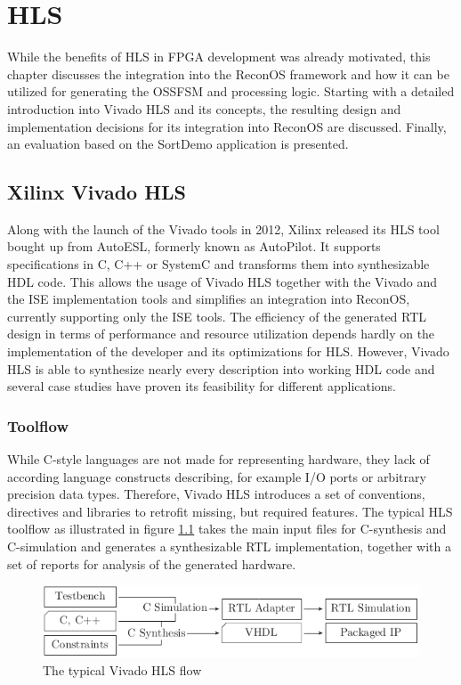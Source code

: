\chapter{\acl{HLS}}
\label{chap:hls}
While the benefits of \ac{HLS} in \ac{FPGA} development was already motivated,
this chapter discusses the integration into the ReconOS framework and how it
can be utilized for generating the \ac{OSSFSM} and processing logic. Starting
with a detailed introduction into Vivado HLS and its concepts, the resulting
design and implementation decisions for its integration into ReconOS are
discussed. Finally, an evaluation based on the SortDemo application is
presented.

\section{Xilinx Vivado HLS}
Along with the launch of the Vivado tools in 2012, Xilinx released its
\ac{HLS} tool bought up from AutoESL, formerly known as AutoPilot. It supports
specifications in C, C++ or SystemC and transforms them into synthesizable
\ac{HDL} code. This allows the usage of Vivado \ac{HLS} together with the
Vivado and the ISE implementation tools and simplifies an integration into
ReconOS, currently supporting only the ISE tools. The efficiency of the
generated RTL design in terms of performance and resource utilization depends
hardly on the implementation of the developer and its optimizations for
\ac{HLS}. However, Vivado HLS is able to synthesize nearly every description
into working \ac{HDL} code and several case studies \citep{SWL13,OCC14} have
proven its feasibility for different applications.

\subsection{Toolflow}
While C-style languages are not made for representing hardware, they lack of
according language constructs describing, for example I/O ports or arbitrary
precision data types. Therefore, Vivado HLS introduces a set of conventions,
directives and libraries to retrofit missing, but required features. The
typical \ac{HLS} toolflow as illustrated in figure \ref{fig:hls_flow} takes
the main input files for C-synthesis and C-simulation and generates a
synthesizable \ac{RTL} implementation, together with a set of reports for
analysis of the generated hardware.
\begin{figure}[tb]
	\centering
	\includegraphics{../figures/hls_flow}
	\caption{The typical Vivado HLS flow \citep[adapted from][]{ug902}}
	\label{fig:hls_flow}
\end{figure}

